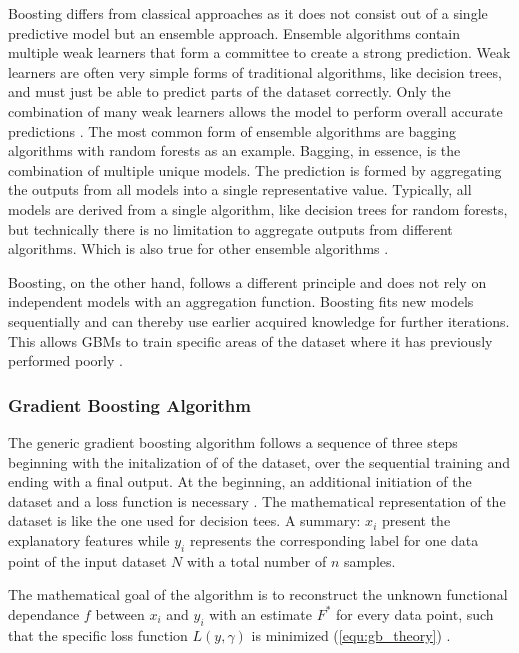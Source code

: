 Boosting differs from classical approaches as it does not consist out of a single predictive 
model but an ensemble approach. Ensemble algorithms contain multiple weak learners that form a 
committee to create a strong prediction. Weak learners are often very simple forms of traditional 
algorithms, like decision trees, and must just be able to predict parts of the dataset correctly. 
Only the combination of many weak learners allows the model to perform overall accurate 
predictions \cite{parr2022gb_explained_dtt} \cite[p.1f]{Buhlmann2004Bagging}. The most common form of ensemble algorithms are bagging algorithms with random 
forests as an example. Bagging, in essence, is the combination of multiple unique models. The 
prediction is formed by aggregating the outputs from all models into a single representative 
value. Typically, all models are derived from a single algorithm, like decision trees for random 
forests, but technically there is no limitation to aggregate outputs from different algorithms. 
Which is also true for other ensemble algorithms \cite[p.2]{Buhlmann2004Bagging}. 

Boosting, on the other hand, follows a different principle and does not rely on independent 
models with an aggregation function. Boosting fits new models sequentially and can thereby use 
earlier acquired knowledge for further iterations. This allows GBMs to train specific areas of 
the dataset where it has previously performed poorly \cite[p.11]{Buhlmann2004Bagging} \cite[p.345f]{James2021}.  

\subsubsection{Gradient Boosting Algorithm}
\label{sec:Gradient Boosting Algorithm}

The generic gradient boosting algorithm follows a sequence of three steps beginning with the initalization of
of the dataset, over the sequential training and ending with a final output. At the beginning, an 
additional initiation of the dataset and a loss function is necessary \cite{parr2022gb_explained_hrd}. The mathematical 
representation of the dataset is like the one used for decision tees. A summary: \(x_{i}\) present the 
explanatory features while \(y_{i}\) represents the corresponding label for one data point of the input 
dataset \(N\) with a total number of \(n\) samples. 

The mathematical goal of the algorithm is to reconstruct the unknown functional dependance \(f\) 
between \(x_{i}\) and \(y_{i}\) with an estimate \(F^{*}\) for every data point, such that the specific loss 
function \(L(y, \gamma)\) is minimized (\ref{equ:gb_theory}) \cite[p.1189]{Friedman_2001} \cite[2.1]{Natekin2013}. 

